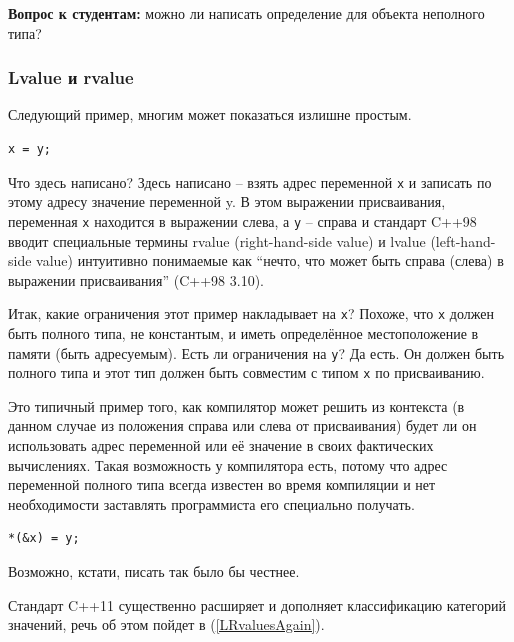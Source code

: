 \documentclass[a4paper,12pt,oneside]{article}
\newif\ifanswers
\begin{document}
\textbf{Вопрос к студентам:} можно ли написать определение для объекта неполного типа?

\ifanswers
Правильный ответ: конечно нет, так как неизвестно сколько памяти надо такому объекту. Но можно написать определение указателя на такой объект.
\fi

\subsubsection{Lvalue и rvalue}\label{LRvalues}

Следующий пример, многим может показаться излишне простым.

\begin{lstlisting}
x = y;
\end{lstlisting}

Что здесь написано? Здесь написано – взять адрес переменной \lstinline!x! и записать по этому адресу значение переменной y. В этом выражении присваивания, переменная \lstinline!x! находится в выражении слева, а \lstinline!y! -- справа и стандарт C++98 вводит специальные термины rvalue (right-hand-side value) и lvalue (left-hand-side value) интуитивно понимаемые как ``нечто, что может быть справа (слева) в выражении присваивания'' (C++98 3.10). 

Итак, какие ограничения этот пример накладывает на \lstinline!x!? Похоже, что \lstinline!x! должен быть полного типа, не константым, и иметь определённое местоположение в памяти (быть адресуемым). Есть ли ограничения на \lstinline!y!? Да есть. Он должен быть полного типа и этот тип должен быть совместим с типом \lstinline!x! по присваиванию.  

Это типичный пример того, как компилятор может решить из контекста (в данном случае из положения справа или слева от присваивания) будет ли он использовать адрес переменной или её значение в своих фактических вычислениях. Такая возможность у компилятора есть, потому что адрес переменной полного типа всегда известен во время компиляции и нет необходимости заставлять программиста его специально получать.

\begin{lstlisting}
*(&x) = y;
\end{lstlisting}

Возможно, кстати, писать так было бы честнее.

Стандарт C++11 существенно расширяет и дополняет классификацию категорий значений, речь об этом пойдет в (\ref{LRvaluesAgain}).
\end{document}
